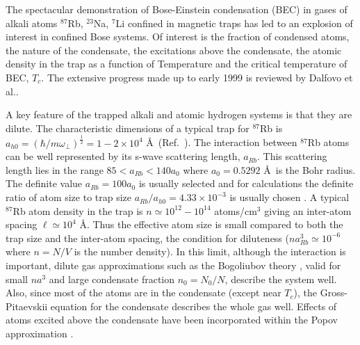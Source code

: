  


 The spectacular demonstration of Bose-Einstein condensation (BEC) in gases of
 alkali atoms $^{87}$Rb, $^{23}$Na, $^7$Li confined in magnetic
 traps \cite{anderson95,davis95,bradley95} has led to an explosion of interest in
 confined Bose systems. Of interest is the fraction of condensed atoms, the
 nature of the condensate, the excitations above the condensate, the atomic
 density in the trap as a function of Temperature and the critical temperature of BEC,
 $T_c$. The extensive progress made up to early 1999 is reviewed by Dalfovo et
 al.\cite{dalfovo1999}.

 A key feature of the trapped alkali and atomic hydrogen systems is that they are
 dilute. The characteristic dimensions of a typical trap for $^{87}$Rb is
 $a_{h0}=\left( {\hbar}/{m\omega_\perp}\right)^\frac{1}{2}=1-2 \times 10^4$
 \AA\ (Ref.~\cite{anderson95}). The interaction between $^{87}$Rb atoms can be well represented
 by its s-wave scattering length, $a_{Rb}$. This scattering length lies in the
 range $85 < a_{Rb} < 140 a_0$ where $a_0 = 0.5292$ \AA\ is the Bohr radius.
 The definite value $a_{Rb} = 100 a_0$ is usually selected and
 for calculations the definite ratio of atom size to trap size 
 $a_{Rb}/a_{h0} = 4.33 \times 10^{-3}$ 
 is usually chosen \cite{dalfovo1999}. A typical $^{87}$Rb atom
 density in the trap is $n \simeq 10^{12}- 10^{14}$ atoms/cm$^3$ giving an
 inter-atom spacing $\ell \simeq 10^4$ \AA. Thus the effective atom size is small
 compared to both the trap size and the inter-atom spacing, the condition
 for diluteness ($na^3_{Rb} \simeq 10^{-6}$ where $n = N/V$ is the number
 density). In this limit,
 although the interaction is important, dilute gas approximations such as the
 Bogoliubov theory \cite{bogo1958}, valid for small $na^3$ and large
 condensate fraction $n_0 = N_0/N$, describe the system well. Also, since most
 of the atoms are in the condensate (except near $T_c$), the Gross-Pitaevskii
 equation \cite{gross1961,pita1961} 
for the condensate describes the whole gas
 well. Effects of atoms excited above the condensate have been incorporated
 within the Popov approximation \cite{hutchinson97}. 



